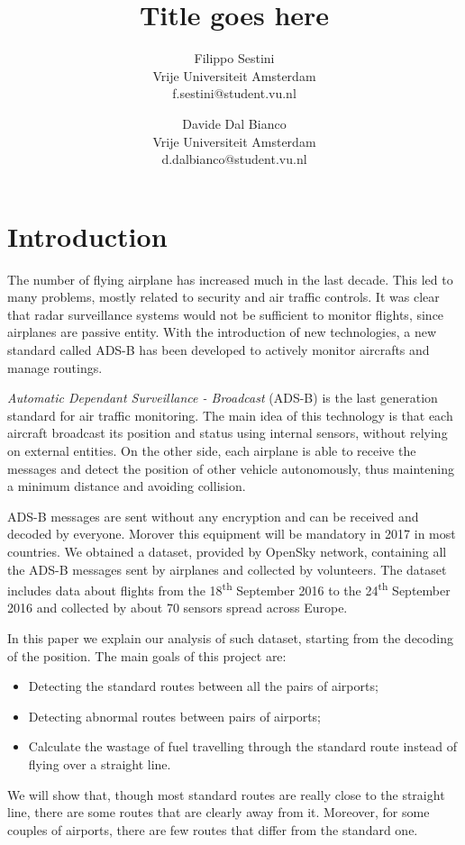 \documentclass{vldb}
\title{Title goes here}
\author{Filippo Sestini \\ Vrije Universiteit Amsterdam \\ f.sestini@student.vu.nl \and
  Davide Dal Bianco \\ Vrije Universiteit Amsterdam \\ d.dalbianco@student.vu.nl}
\begin{document}
\maketitle

\section{Introduction}

The number of flying airplane has increased much in the last decade. This led to
many problems, mostly related to security and air traffic controls. It was clear
that radar surveillance systems would not be sufficient to monitor flights,
since airplanes are passive entity. With the introduction of new technologies, a
new standard called ADS-B has been developed to actively monitor aircrafts and
manage routings.

\textit{Automatic Dependant Surveillance - Broadcast} (ADS-B) is the last
generation standard for air traffic monitoring. The main idea of this technology
is that each aircraft broadcast its position and status using internal sensors,
without relying on external entities. On the other side, each airplane is able
to receive the messages and detect the position of other vehicle autonomously,
thus maintening a minimum distance and avoiding collision.

ADS-B messages are sent without any encryption and can be received and decoded
by everyone. Morover this equipment will be mandatory in 2017 in most countries.
We obtained a dataset, provided by OpenSky network, containing all the ADS-B
messages sent by airplanes and collected by volunteers. The dataset includes
data about flights from the 18\textsuperscript{th} September 2016 to the
24\textsuperscript{th} September 2016 and collected by about 70 sensors spread
across Europe.

In this paper we explain our analysis of such dataset, starting from the
decoding of the position. The main goals of this project are:
\begin{itemize}
  \item Detecting the standard routes between all the pairs of airports;
  \item Detecting abnormal routes between pairs of airports;
  \item Calculate the wastage of fuel travelling through the standard route
  instead of flying over a straight line.
\end{itemize}

We will show that, though most standard routes are really close to the straight
line, there are some routes that are clearly away from it. Moreover, for some
couples of airports, there are few routes that differ from the standard one.
\end{document}
